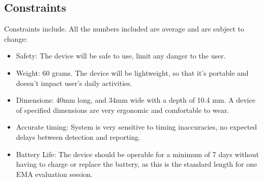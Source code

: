 \documentclass{article}
\begin{document}
\subsection{Constraints}
Constraints include. All the numbers included are average and are subject to change:
\begin{itemize}
    \item Safety: The device will be safe to use, limit any danger to the user.
    \item Weight: 60 grams. The device will be lightweight, so that it's portable and doesn't impact user's daily activities.
    \item Dimensions: 40mm long, and 34mm wide with a depth of 10.4 mm. A device of specified dimensions are very ergonomic and comfortable to wear.
    \item Accurate timing: System is very sensitive to timing inaccuracies, no \linebreak expected delays between detection and reporting.
    \item Battery Life: The device should be operable for a minimum of 7 days without having to charge or replace the battery, as this is the standard length for one EMA evaluation session.
\end{itemize}
\pagebreak
\end{document}
